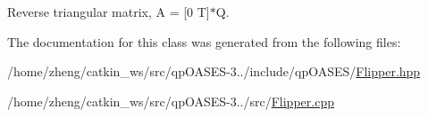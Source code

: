 Reverse triangular matrix, A = \mbox{[}0 T\mbox{]}$\ast$Q\textquotesingle{}. 

The documentation for this class was generated from the following files\+:\begin{DoxyCompactItemize}
\item 
/home/zheng/catkin\+\_\+ws/src/qp\+O\+A\+S\+E\+S-\/3../include/qp\+O\+A\+S\+E\+S/\hyperlink{_flipper_8hpp}{Flipper.\+hpp}\item 
/home/zheng/catkin\+\_\+ws/src/qp\+O\+A\+S\+E\+S-\/3../src/\hyperlink{_flipper_8cpp}{Flipper.\+cpp}\end{DoxyCompactItemize}
